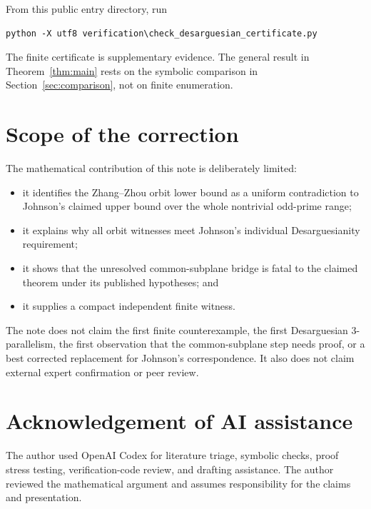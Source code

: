 \documentclass[11pt]{article}
\begin{document}
From this public entry directory, run
\begin{verbatim}
python -X utf8 verification\check_desarguesian_certificate.py
\end{verbatim}

The finite certificate is supplementary evidence. The general result in
Theorem~\ref{thm:main} rests on the symbolic comparison in
Section~\ref{sec:comparison}, not on finite enumeration.

\section{Scope of the correction}

The mathematical contribution of this note is deliberately limited:
\begin{itemize}
\item it identifies the Zhang--Zhou orbit lower bound as a uniform
contradiction to Johnson's claimed upper bound over the whole nontrivial
odd-prime range;
\item it explains why all orbit witnesses meet Johnson's individual
Desarguesianity requirement;
\item it shows that the unresolved common-subplane bridge is fatal to the
claimed theorem under its published hypotheses; and
\item it supplies a compact independent finite witness.
\end{itemize}

The note does not claim the first finite counterexample, the first
Desarguesian $3$-parallelism, the first observation that the common-subplane
step needs proof, or a best corrected replacement for Johnson's
correspondence. It also does not claim external expert confirmation or peer
review.

\section*{Acknowledgement of AI assistance}

The author used OpenAI Codex for literature triage, symbolic checks, proof
stress testing, verification-code review, and drafting assistance. The author
reviewed the mathematical argument and assumes responsibility for the claims
and presentation.
\end{document}
